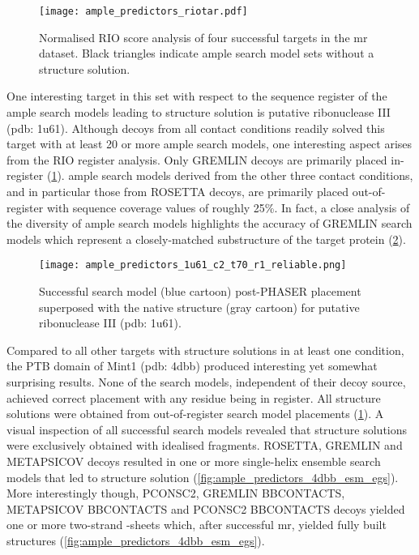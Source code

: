 \begin{figure}[H]
    \centering
    \texttt{[image: ample\_predictors\_riotar.pdf]}
    \caption{Normalised RIO score analysis of four successful targets in the \gls{mr} dataset. Black triangles indicate \gls{ample} search model sets without a structure solution.}
    \label{fig:ample_predictor_riotar}
\end{figure}

One interesting target in this set with respect to the sequence register of the \gls{ample} search models leading to structure solution is putative ribonuclease III (\gls{pdb}: 1u61). Although decoys from all contact conditions readily solved this target with at least 20 or more \gls{ample} search models, one interesting aspect arises from the RIO register analysis. Only GREMLIN decoys are primarily placed in-register (\cref{fig:ample_predictor_riotar}). \gls{ample} search models derived from the other three contact conditions, and in particular those from ROSETTA decoys, are primarily placed out-of-register with sequence coverage values of roughly 25\%. In fact, a close analysis of the diversity of \gls{ample} search models highlights the accuracy of GREMLIN search models which represent a closely-matched substructure of the target protein (\cref{fig:ample_predictors_1u61_c2_t70_r1_reliable}).  

\begin{figure}[H]
    \centering
    \texttt{[image: ample\_predictors\_1u61\_c2\_t70\_r1\_reliable.png]}
    \caption{Successful search model (blue cartoon) post-PHASER placement superposed with the native structure (gray cartoon) for putative ribonuclease III (\gls{pdb}: 1u61).}
    \label{fig:ample_predictors_1u61_c2_t70_r1_reliable}
\end{figure}

Compared to all other targets with structure solutions in at least one condition, the PTB domain of Mint1 (\gls{pdb}: 4dbb) produced interesting yet somewhat surprising results. None of the search models, independent of their decoy source, achieved correct placement with any residue being in register. All structure solutions were obtained from out-of-register search model placements (\cref{fig:ample_predictor_riotar}). A visual inspection of all successful search models revealed that structure solutions were exclusively obtained with idealised fragments. ROSETTA, GREMLIN and METAPSICOV decoys resulted in one or more single-helix ensemble search models that led to structure solution (\cref{fig:ample_predictors_4dbb_esm_egs}). More interestingly though, PCONSC2, GREMLIN BBCONTACTS, METAPSICOV BBCONTACTS and PCONSC2 BBCONTACTS decoys yielded one or more two-strand \textbeta-sheets which, after successful \gls{mr}, yielded fully built structures (\cref{fig:ample_predictors_4dbb_esm_egs}).

